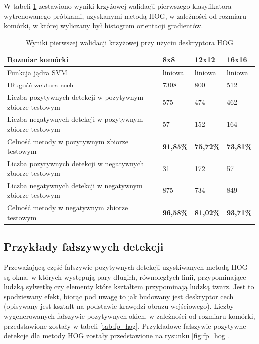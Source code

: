 W tabeli \ref{tab:hog_first} zestawiono wyniki krzyżowej walidacji pierwszego klasyfikatora wytrenowanego 
próbkami, uzyskanymi metodą HOG, w zależności od rozmiaru komórki, w której wyliczany był histogram orientacji gradientów.

\begin{center}
    \begin{longtable}{ | p{5cm} | p{3cm} | p{3cm} | p{3cm} |}
    \caption{Wyniki pierwszej walidacji krzyżowej przy użyciu deskryptora HOG}
    \label{tab:hog_first} \\
    \hline
	Rozmiar komórki & 8x8 & 12x12 & 16x16 \\ \hline
	Funkcja jądra SVM & liniowa & liniowa & liniowa  \\ \hline
    Długość wektora cech & 7308 & 800 & 512 \\ \hline
    Liczba pozytywnych detekcji w pozytywnym zbiorze testowym & 575 & 474 & 462 \\ \hline
    Liczba negatywnych detekcji w pozytywnym zbiorze testowym & 57 & 152 & 164 \\ \hline
    Celność metody w pozytywnym zbiorze testowym & \textbf{91,85\%} & \textbf{75,72\%} & \textbf{73,81\%} \\ \hline
    Liczba pozytywnych detekcji w negatywnych zbiorze testowym & 31 & 172 & 57 \\ \hline
    Liczba negatywnych detekcji w negatywnym zbiorze testowym & 875 & 734 & 849 \\ \hline
    Celność metody w negatywnym zbiorze testowym & \textbf{96,58\%} & \textbf{81,02\%} & \textbf{93,71\%} \\ \hline
    \end{longtable}
\end{center}

\subsection{Przykłady fałszywych detekcji}

Przeważającą część fałszywie pozytywnych detekcji uzyskiwanych metodą HOG są okna, w których występują pary długich, równoległych linii, przypominające ludzką sylwetkę czy elementy które kształtem przypominają ludzką twarz. Jest to spodziewany efekt, biorąc pod uwagę to jak budowany jest deskryptor cech (opisywany jest kształt na podstawie krawędzi obrazu wejściowego).
Liczby wygenerowanych fałszywie pozytywnych okien, w zależności od rozmiaru komórki, przedstawione zostały w tabeli \ref{tab:fp_hog}.
Przykładowe fałszywie pozytywne detekcje dla metody HOG zostały przedstawione na rysunku \ref{fig:fp_hog}.

